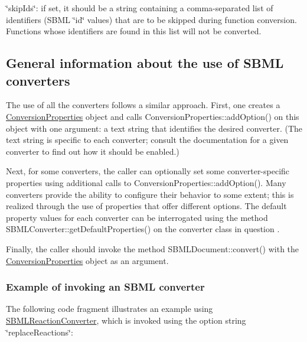 \begin{DoxyItemize}
\item {\ttfamily \char`\"{}skip\+Ids\char`\"{}}\+: if set, it should be a string containing a comma-\/separated list of identifiers (S\+B\+ML \char`\"{}id\char`\"{} values) that are to be skipped during function conversion. Functions whose identifiers are found in this list will not be converted.\end{DoxyItemize}
\hypertarget{classdoc__section__using__sbml__converters_using-converters}{}\subsection{General information about the use of S\+B\+M\+L converters}\label{classdoc__section__using__sbml__converters_using-converters}
The use of all the converters follows a similar approach. First, one creates a \hyperlink{class_conversion_properties}{Conversion\+Properties} object and calls Conversion\+Properties\+::add\+Option() on this object with one argument\+: a text string that identifies the desired converter. (The text string is specific to each converter; consult the documentation for a given converter to find out how it should be enabled.)

Next, for some converters, the caller can optionally set some converter-\/specific properties using additional calls to Conversion\+Properties\+::add\+Option(). Many converters provide the ability to configure their behavior to some extent; this is realized through the use of properties that offer different options. The default property values for each converter can be interrogated using the method S\+B\+M\+L\+Converter\+::get\+Default\+Properties() on the converter class in question .

Finally, the caller should invoke the method S\+B\+M\+L\+Document\+::convert() with the \hyperlink{class_conversion_properties}{Conversion\+Properties} object as an argument.\hypertarget{classdoc__section__using__sbml__converters_converter-example}{}\subsubsection{Example of invoking an S\+B\+M\+L converter}\label{classdoc__section__using__sbml__converters_converter-example}
The following code fragment illustrates an example using \hyperlink{class_s_b_m_l_reaction_converter}{S\+B\+M\+L\+Reaction\+Converter}, which is invoked using the option string {\ttfamily \char`\"{}replace\+Reactions\char`\"{}}\+:

